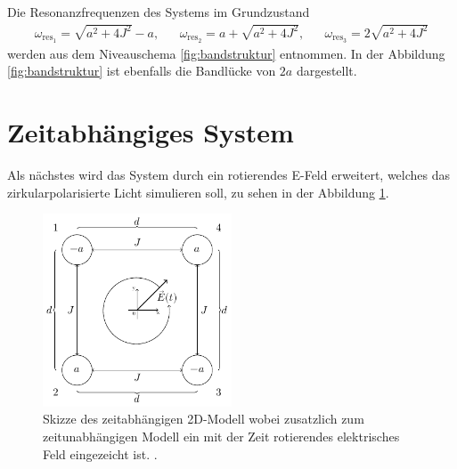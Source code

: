 Die Resonanzfrequenzen des Systems im Grundzustand
\begin{align}
\omega_{\text{res}_1}=\sqrt{a^2+4J^2}-a,
& &\omega_{\text{res}_2}=a+\sqrt{a^2+4J^2},
& &\omega_{\text{res}_3}=2\sqrt{a^2+4J^2} \label{eqn:Resonanz}
\end{align}
werden aus dem Niveauschema \ref{fig:bandstruktur} entnommen. In der Abbildung \ref{fig:bandstruktur} ist ebenfalls die Bandlücke von $2a$
dargestellt.

\section{Zeitabhängiges System}
Als nächstes wird das System durch ein rotierendes E-Feld erweitert, welches
das zirkularpolarisierte Licht simulieren soll, zu sehen in der Abbildung \ref{fig:syst+E}.

\begin{figure}
   \centering
   \includegraphics[width=0.5\textwidth]{Programme/Tikz_test/bild_gitter.pdf}
   \caption{Skizze des zeitabhängigen 2D-Modell
wobei zusatzlich zum zeitunabhängigen Modell
ein mit der Zeit rotierendes elektrisches Feld
eingezeicht ist.
  . }
   \label{fig:syst+E}
\end{figure}


